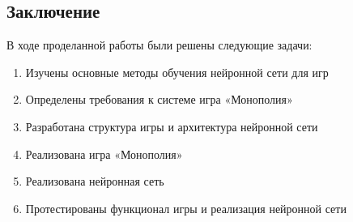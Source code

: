\newpage
\setlength{\parskip}{0cm}
\begin{Large}
\section*{Заключение}
В ходе проделанной работы были решены следующие задачи:
\begin{spacing}{0.9}
\begin{enumerate}
    \item Изучены основные методы обучения нейронной сети для игр 
    \item Определены требования к системе игра «Монополия»
    \item Разработана структура игры и архитектура нейронной сети
    \item Реализована игра «Монополия»
    \item Реализована нейронная сеть 
    \item Протестированы функционал игры и реализация нейронной сети
\end{enumerate}
\end{spacing}
\end{Large}